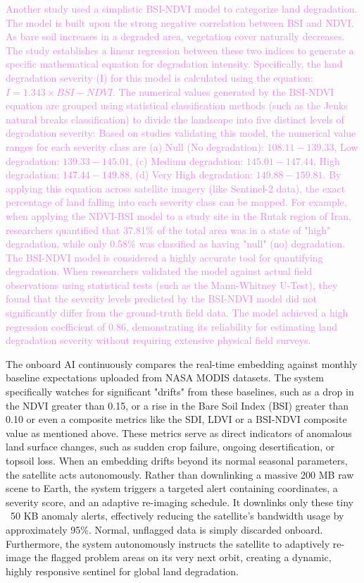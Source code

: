 \documentclass[11pt,letterpaper]{article}
\theoremstyle{plain}
\theoremstyle{definition}
\theoremstyle{remark}
\begin{document}
\textcolor{violet}{Another study \cite{ebrahimi2024assessing} used a simplistic BSI-NDVI model to categorize land degradation. The model is built upon the strong negative correlation between BSI and NDVI. As bare soil increases in a degraded area, vegetation cover naturally decreases. The study establishes a linear regression between these two indices to generate a specific mathematical equation for degradation intensity. Specifically, the land degradation severity (I) for this model is calculated using the equation: $I = 1.343 \times BSI - NDVI$. The numerical values generated by the BSI-NDVI equation are grouped using statistical classification methods (such as the Jenks natural breaks classification) to divide the landscape into five distinct levels of degradation severity: Based on studies validating this model, the numerical value ranges for each severity class are (a) Null (No degradation): $108.11 - 139.33$, Low degradation: $139.33 - 145.01$, (c) Medium degradation: $145.01 - 147.44$, High degradation: $147.44 - 149.88$, (d) Very High degradation: $149.88 - 159.81$. By applying this equation across satellite imagery (like Sentinel-2 data), the exact percentage of land falling into each severity class can be mapped. For example, when applying the NDVI-BSI model to a study site in the Rutak region of Iran, researchers quantified that 37.81\% of the total area was in a state of "high" degradation, while only 0.58\% was classified as having "null" (no) degradation. The BSI-NDVI model is considered a highly accurate tool for quantifying degradation. When researchers validated the model against actual field observations using statistical tests (such as the Mann-Whitney U-Test), they found that the severity levels predicted by the BSI-NDVI model did not significantly differ from the ground-truth field data. The model achieved a high regression coefficient of 0.86, demonstrating its reliability for estimating land degradation severity without requiring extensive physical field surveys.}

The onboard AI continuously compares the real-time embedding against monthly baseline expectations uploaded from NASA MODIS datasets. The system specifically watches for significant "drifts" from these baselines, such as a drop in the NDVI greater than 0.15, or a rise in the Bare Soil Index (BSI) greater than 0.10 or even a composite metrics like the SDI, LDVI or a BSI-NDVI composite value as mentioned above. These metrics serve as direct indicators of anomalous land surface changes, such as sudden crop failure, ongoing desertification, or topsoil loss. When an embedding drifts beyond its normal seasonal parameters, the satellite acts autonomously. Rather than downlinking a massive 200 MB raw scene to Earth, the system triggers a targeted alert containing coordinates, a severity score, and an adaptive re-imaging schedule. It downlinks only these tiny ~50 KB anomaly alerts, effectively reducing the satellite's bandwidth usage by approximately 95\%. Normal, unflagged data is simply discarded onboard. Furthermore, the system autonomously instructs the satellite to adaptively re-image the flagged problem areas on its very next orbit, creating a dynamic, highly responsive sentinel for global land degradation.
\end{document}
